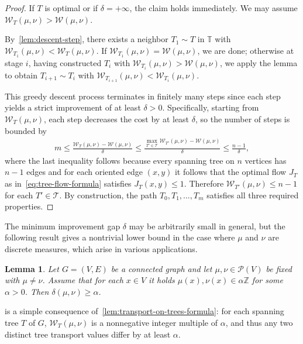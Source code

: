\documentclass[10pt,a4paper]{amsart}
\newcommand{\prob}{{\mathscr{P}}}
\newcommand{\wass}{{\mathcal{W}}}
\newcommand{\setoftrees}{{\mathcal{T}}}
\newcommand{\stategraph}{{\mathbb{T}}}
\newtheorem{lemma}[theorem]{Lemma}
\begin{document}
\begin{proof}
    If $T$ is optimal or if $\delta = +\infty$, the claim holds immediately. We may assume $\wass_{T}(\mu,\nu) > \wass(\mu,\nu)$. 
    
    By~\cref{lem:descent-step}, there exists a neighbor $T_1\sim T$ in $\stategraph$ with $\wass_{T_1}(\mu,\nu) < \wass_{T}(\mu,\nu)$. If $\wass_{T_1}(\mu,\nu)=\wass(\mu,\nu)$, we are done; otherwise at stage $i$, having constructed $T_i$ with $\wass_{T_i}(\mu,\nu) > \wass(\mu,\nu)$, we apply the lemma to obtain $T_{i+1}\sim T_i$ with $\wass_{T_{i+1}}(\mu,\nu) < \wass_{T_i}(\mu,\nu)$.

    This greedy descent process terminates in finitely many steps since each step yields a strict improvement of at least $\delta > 0$. Specifically, starting from $\wass_{T}(\mu,\nu)$, each step decreases the cost by at least $\delta$, so the number of steps is bounded by
        \begin{align*}
            m \leq \frac{\wass_{T}(\mu,\nu) - \wass(\mu,\nu)}{\delta} \leq \frac{\max_{T'\in\setoftrees} \wass_{T'}(\mu,\nu) - \wass(\mu,\nu)}{\delta} \leq \frac{n-1}{\delta},
        \end{align*}
    where the last inequality follows because every spanning tree on $n$ vertices has $n-1$ edges and for each oriented edge $(x,y)$ it follows that the optimal flow $J_{T}$ as in~\cref{eq:tree-flow-formula} satisfies $J_T(x,y)\le 1$. Therefore $\wass_{T'}(\mu,\nu)\le n-1$ for each $T'\in\setoftrees$. By construction, the path $T_0, T_1, \dotsc, T_m$ satisfies all three required properties.
\end{proof}


The minimum improvement gap $\delta$ may be arbitrarily small in general, but the following result gives a nontrivial lower bound in the case where $\mu$ and $\nu$ are discrete measures, which arise in various applications.

\begin{lemma}\label{lem:rational-measures-gap}
    Let $G=(V,E)$ be a connected graph and let $\mu,\nu\in\prob(V)$ be fixed with $\mu\ne \nu$. Assume that for each $x\in V$ it holds $\mu(x),\nu(x) \in \alpha\mathbb{Z}$ for some $\alpha > 0$. Then $\delta(\mu,\nu) \geq \alpha$.
\end{lemma}

 is a simple consequence of~\cref{lem:transport-on-trees-formula}: for each spanning tree $T$ of $G$, $\wass_T(\mu,\nu)$ is a nonnegative integer multiple of $\alpha$, and thus any two distinct tree transport values differ by at least $\alpha$. 
\end{document}
